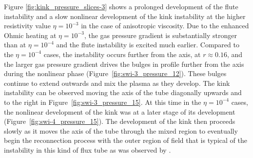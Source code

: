 \documentclass[fleqn,usenatbib]{mnras}
\newcommand{\rev}[1]{{\color{red} {#1}}}
\newcommand{\revcite}[1]{{\color{red} \underline{#1}}}
\begin{document}
Figure \ref{fig:kink_pressure_slices-3} shows a prolonged development of the
flute instability and a slow nonlinear development of the kink instability at
the higher resistivity value $\eta=10^{-3}$ in the case of anisotropic
viscosity. Due to the enhanced Ohmic heating at $\eta=10^{-3}$, the \rev{gas} pressure
gradient is substantially stronger than at $\eta=10^{-4}$ and the flute
instability is excited much earlier. Compared to the $\eta=10^{-4}$ cases, the
instability occurs further from the axis, at $r\approx0.16$, and the larger
\rev{gas} pressure gradient drives the bulges in profile further from the axis during the
nonlinear phase (Figure~\ref{fig:swi-3_pressure_12}). These bulges continue to
extend outwards and mix the plasma as they develop. The kink instability can be
observed moving the axis of the tube diagonally upwards and to the right in
Figure~\ref{fig:swi-3_pressure_15}. At this time in the $\eta=10^{-4}$ cases,
the nonlinear development of the kink was at a later stage of its development
(Figure~\ref{fig:swi-4_pressure_15}). The development of the kink then proceeds
slowly as it moves the axis of the tube through the mixed region to eventually
begin the reconnection process with the outer region of field that is typical
of the instability in this kind of flux tube as was observed by \revcite{\citet{quinnEffectAnisotropicViscosity2020}}. 
\end{document}
